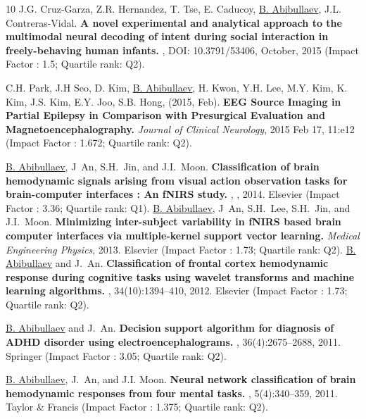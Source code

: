 \documentclass[10pt,letterpaper,sans]{moderncv}   %
\begin{document}
\begin{thebibliography}{10}
    \small
    J.G. Cruz-Garza, Z.R. Hernandez, T. Tse, E. Caducoy, \underline{B. Abibullaev}, J.L. Contreras-Vidal.
    \newblock \textbf{A novel experimental and analytical approach to the multimodal neural decoding of intent during social interaction in freely-behaving human infants.}
    , DOI: 10.3791/53406, October, 2015 (Impact Factor : 1.5; Quartile rank: Q2).
    
    \small
    C.H. Park, J.H Seo, D. Kim, \underline{B. Abibullaev}, H. Kwon, Y.H. Lee, M.Y. Kim, K. Kim, J.S. Kim, E.Y. Joo, S.B. Hong, (2015, Feb). 
    \newblock \textbf{{EEG} Source Imaging in Partial Epilepsy in Comparison with Presurgical Evaluation and Magnetoencephalography.}
    {\em Journal of Clinical Neurology}, 2015 Feb 17, 11:e12 (Impact Factor : 1.672; Quartile rank: Q2).
    
    \underline{B. Abibullaev}, J~An, S.H.~Jin, and J.I.~Moon.
    \newblock \textbf{Classification of brain hemodynamic signals arising from
    visual action observation tasks for brain-computer interfaces : An {fNIRS} study. }, , 2014. Elsevier (Impact Factor : 3.36; Quartile rank: Q1).
    \underline{B. Abibullaev}, J~An, S.H.~Lee, S.H.~Jin, and J.I.~Moon.
    \newblock \textbf{Minimizing inter-subject variability in {fNIRS} based brain computer interfaces via multiple-kernel support vector learning.}
     {\em Medical Engineering Physics}, 2013. Elsevier (Impact Factor : 1.73; Quartile rank: Q2).
    \underline{B. Abibullaev} and J.~An.
    \newblock \textbf{Classification of frontal cortex hemodynamic response during cognitive tasks using wavelet transforms and machine learning algorithms.}
    , 34(10):1394--410, 2012. Elsevier (Impact Factor : 1.73; Quartile rank: Q2).
    
    \underline{B. Abibullaev} and J.~An.
    \newblock \textbf{Decision support algorithm for diagnosis of {ADHD} disorder using electroencephalograms.}
    , 36(4):2675--2688, 2011. Springer (Impact Factor : 3.05; Quartile rank: Q2).
    
    \underline{B. Abibullaev}, J.~An, and J.I. Moon.
    \newblock \textbf{Neural network classification of brain hemodynamic responses from four mental tasks.} , 5(4):340--359, 2011. Taylor \&  Francis (Impact Factor : 1.375; Quartile rank: Q2).
    

\end{thebibliography}
\end{document}

